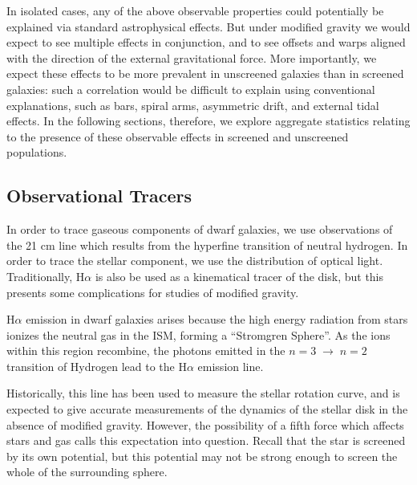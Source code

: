 \documentclass[twocolappendix, numberedappendix]{emulateapj}
\newcommand{\ha}{H$\alpha$}
\begin{document}
In isolated cases,
any of the above observable properties could potentially be explained via
standard astrophysical effects.  But under modified gravity we would expect
to see multiple effects in conjunction, and to see offsets and warps
aligned with the direction of the external gravitational force.
More importantly, we expect these effects to be more prevalent
in unscreened galaxies than in screened galaxies: such a correlation
would be difficult to explain using conventional explanations,
such as bars, spiral arms, asymmetric drift, and external tidal effects.
In the following sections, therefore, we explore aggregate statistics
relating to the presence of these observable effects in screened and
unscreened populations. 

\subsection{Observational Tracers}
\label{sec:halpha}

In order to trace gaseous components of dwarf galaxies,
we use observations of the 21 cm line which results from the hyperfine
transition of neutral hydrogen.
In order to trace the stellar component, we use the distribution of optical
light.  Traditionally, \ha{} is also be used as a kinematical tracer
of the disk, but this presents some complications for studies of
modified gravity.

\ha{} emission in dwarf galaxies arises because
the high energy radiation from stars ionizes the neutral gas in the ISM,
forming a  ``Stromgren Sphere''.
As the ions within this region recombine,
the photons emitted in the $n=3\;\to\;n=2$ transition
of Hydrogen lead to the \ha{} emission line.

Historically, this line has been
used to measure the stellar rotation curve, and is expected to give accurate
measurements of the dynamics of the stellar disk in the absence of modified
gravity. However, the possibility of a fifth force which
affects stars and gas calls this expectation into question.
Recall that the star is screened by its own potential, but this potential
may not be strong enough to screen the whole of the surrounding sphere.
\end{document}

